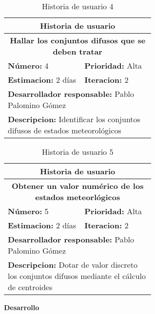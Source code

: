 \begin{table}[H]
        \centering
        \begin{tabular}{|p{0.3\linewidth}|p{0.3\linewidth}|}
          \hline
          \multicolumn{2}{|c|}{Historia de usuario}\\ \hline
          \multicolumn{2}{|c|}{\textbf{Hallar los conjuntos difusos que se deben tratar}}\\ \hline
          \textbf{Número:} 4 & \textbf{Prioridad:} Alta\\ \hline
          \textbf{Estimacion:} 2 días & \textbf{Iteracion:} 2\\ \hline
          \multicolumn{2}{|l|}{\textbf{Desarrollador responsable:} Pablo Palomino Gómez}\\ \hline
          \multicolumn{2}{|p{0.6\linewidth}|}{\textbf{Descripcion:} Identificar los conjuntos difusos de estados meteorológicos}\\ \hline
        \end{tabular}
        \caption{Historia de usuario 4}
        \label{tab:hist4}
\end{table}
\begin{table}[H]
        \centering
        \begin{tabular}{|p{0.3\linewidth}|p{0.3\linewidth}|}
          \hline
          \multicolumn{2}{|c|}{Historia de usuario}\\ \hline
          \multicolumn{2}{|c|}{\textbf{Obtener un valor numérico de los estados meteorlógicos}}\\ \hline
          \textbf{Número:} 5 & \textbf{Prioridad:} Alta\\ \hline
          \textbf{Estimacion:} 2 días & \textbf{Iteracion:} 2\\ \hline
          \multicolumn{2}{|l|}{\textbf{Desarrollador responsable:} Pablo Palomino Gómez}\\ \hline
          \multicolumn{2}{|p{0.6\linewidth}|}{\textbf{Descripcion:} Dotar de valor discreto los conjuntos difusos mediante el cálculo de centroides}\\ \hline
        \end{tabular}
        \caption{Historia de usuario 5}
        \label{tab:hist5}
\end{table}
\textbf{Desarrollo}\\


